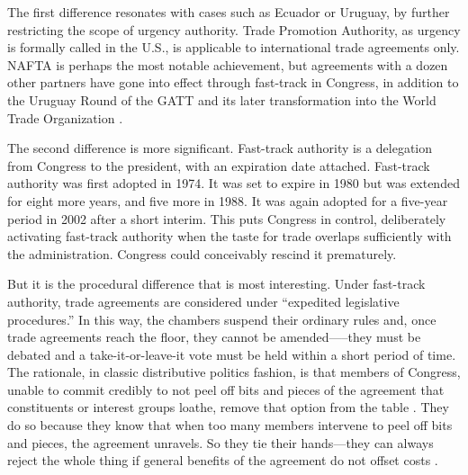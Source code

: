 \documentclass[letter,12pt]{article}
\begin{document}
The first difference resonates with cases such as Ecuador or Uruguay, by further restricting the scope of urgency authority. Trade Promotion Authority, as urgency is formally called in the U.S., is applicable to international trade agreements only.
NAFTA is perhaps the most notable achievement, but agreements with a dozen other partners have gone into effect through fast-track in Congress, in addition to the Uruguay Round of the GATT and its later transformation into the World Trade Organization \citep{crs-2015-tpa}. 

The second difference is more significant. Fast-track authority is a delegation from Congress to the president, with an expiration date attached. Fast-track authority was first adopted in 1974. It was set to expire in 1980 but was extended for eight more years, and five more in 1988. It was again adopted for a five-year period in 2002 after a short interim. This puts Congress in control, deliberately activating fast-track authority when the taste for trade overlaps sufficiently with the administration. Congress could conceivably rescind it prematurely.

But it is the procedural difference that is most interesting. Under fast-track authority, trade agreements are considered under “expedited legislative procedures.” In this way, the chambers suspend their ordinary rules and, once trade agreements reach the floor, they cannot be amended—--they must be debated and a take-it-or-leave-it vote must be held within a short period of time. The rationale, in classic distributive politics fashion, is that members of Congress, unable to commit credibly to not peel off bits and pieces of the agreement that constituents or interest groups loathe, remove that option from the table \citep{mcnollgast.1987}. They do so because they know that when too many members intervene to peel off bits and pieces, the agreement unravels. So they tie their hands—they can always reject the whole thing if general benefits of the agreement do not offset costs \citep{destler-1992,destler-1991,margolis-1986,haggard-1988,goldstein-1988,lohmann-ohalloran.1994}.
\end{document}
